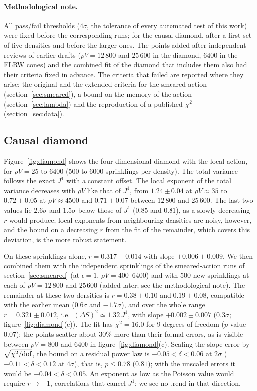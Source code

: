\documentclass{iopjournal}
\newcommand{\fref}[1]{figure~\ref{#1}}
\newcommand{\Fref}[1]{Figure~\ref{#1}}
\newcommand{\rhoV}{\rho V}
\newcommand{\Jone}{J^{1}}
\begin{document}
\paragraph{Methodological note.} All pass/fail thresholds ($4\sigma$, the
tolerance of every automated test of this work) were fixed before the
corresponding runs; for the causal diamond, after a first set of five
densities and before the larger ones. The points added after independent
reviews of earlier drafts ($\rhoV=12\,800$ and $25\,600$ in the diamond,
$6400$ in the FLRW cones) and the combined fit of the diamond that includes
them also had their criteria fixed in advance. The criteria that failed are reported where
they arise: the original and the extended criteria for the smeared action
(section~\ref{sec:smeared}), a bound on the memory of the action
(section~\ref{sec:lambda}) and the reproduction of a published $\chi^2$
(section~\ref{sec:data}).

\subsection{Causal diamond}

\Fref{fig:diamond} shows the four-dimensional diamond with the local action,
for $\rhoV=25$ to $6400$ (500 to 6000 sprinklings per density). The total
variance follows the exact $\Jone$ with a constant offset. The local
exponent of the total variance decreases with $\rhoV$ like that of $\Jone$,
from $1.24\pm0.04$ at $\rhoV\approx35$ to $0.72\pm0.05$ at $\rhoV\approx4500$
and $0.71\pm0.07$ between $12\,800$ and $25\,600$. The last two values lie
$2.6\sigma$ and $1.5\sigma$ below those of $\Jone$ ($0.85$ and $0.81$), as a
slowly decreasing $r$ would produce; local exponents from neighbouring
densities are noisy, however, and the bound on a decreasing $r$ from the fit
of the remainder, which covers this deviation, is the more robust statement.

On these sprinklings alone, $r=0.317\pm0.014$ with slope $+0.006\pm0.009$. We
then combined them with the independent sprinklings of the smeared-action
runs of section~\ref{sec:smeared} (at $\epsilon=1$, $\rhoV=400$--$6400$) and
with 500 new sprinklings at each of $\rhoV=12\,800$ and $25\,600$ (added
later; see the methodological note). The remainder at these two densities is
$r=0.38\pm0.10$ and $0.19\pm0.08$, compatible with the earlier mean
($0.6\sigma$ and $-1.7\sigma$), and over the whole range $r=0.321\pm0.012$,
i.e.\ $(\Delta S)^2\simeq1.32\,\Jone$, with slope $+0.002\pm0.007$
($0.3\sigma$; \fref{fig:diamond}(c)). The fit has $\chi^2=16.0$ for 9 degrees
of freedom ($p$-value $0.07$): the points scatter about $30\%$ more than
their formal errors, as is visible between $\rhoV=800$ and $6400$ in
\fref{fig:diamond}(c). Scaling the slope error by $\sqrt{\chi^2/{\rm dof}}$,
the bound on a residual power law is $-0.05<\delta<0.06$ at $2\sigma$
($-0.11<\delta<0.12$ at $4\sigma$), that is, $p\le0.78$ ($0.81$); with the
unscaled errors it would be $-0.04<\delta<0.05$. An exponent as low as the
Poisson value would require $r\to-1$, correlations that cancel $\Jone$; we
see no trend in that direction.
\end{document}
